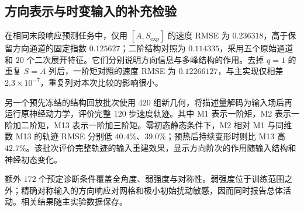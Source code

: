 \documentclass[UTF8,fontset=windows,11pt]{ctexart}
\begin{document}
\subsection{方向表示与时变输入的补充检验}\label{app:structure_experiment}
在相同末段响应预测任务中，仅用 $[A,S_{\exp}]$ 的速度 RMSE 为 $0.236318$，高于保留方向通道的固定指数 $0.125627$；二阶结构对照为 $0.114335$，采用五个原始通道和 $20$ 个二次展开特征。它们分别说明方向信息与多峰结构的作用。去掉 $q=1$ 的重复 $S=A$ 列后，一阶矩对照的速度 RMSE 为 $0.12266127$，与主实现仅相差 $2.3\times10^{-7}$，重复列对本次比较的影响很小。

另一个预先冻结的结构回放批次使用 $420$ 组新几何，将描述量解码为输入场后再运行原神经动力学，评价完整 $120$ 步速度轨迹。其中 M1 表示一阶矩，M2 表示一阶加二阶矩，M13 表示一阶加三阶矩。零初态静态条件下，M2 相对 M1 与同维数 M13 的轨迹 RMSE 分别低 $40.4\%$、$39.0\%$；预热后持续变形时则比 M13 高 $42.7\%$。该批次评价完整轨迹的输入重建效果，显示方向阶次的作用随输入结构和神经初态变化。


额外 $172$ 个预定诊断条件覆盖全角度、弱强度与对称性。弱强度位于训练范围之外；精确对称输入的方向响应对网格和极小初始扰动敏感，因而同时报告总体活动。相关结果随主实验数据保存。
\end{document}
